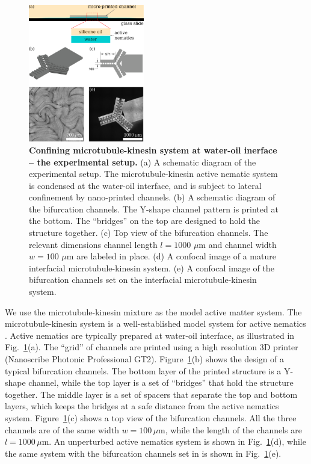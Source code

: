 \documentclass[%
10pt,
superscriptaddress,
twocolumn,
 amsmath,amssymb,
 aps,prx,
]{revtex4-2}
\begin{document}
\begin{figure}[!h]
    \includegraphics[width=0.45\textwidth]{2-bifurcation-experiment}
    \caption{
    \textbf{Confining microtubule-kinesin system at water-oil inerface -- the experimental setup.}
    (a) A schematic diagram of the experimental setup. 
    The microtubule-kinesin active nematic system is condensed at the water-oil interface, and is subject to lateral confinement by nano-printed channels. 
    (b) A schematic diagram of the bifurcation channels. 
    The Y-shape channel pattern is printed at the bottom.
    The ``bridges'' on the top are designed to hold the structure together. 
    (c) Top view of the bifurcation channels. 
    The relevant dimensions channel length $l=1000$ $\mu$m and channel width $w=100$ $\mu$m are labeled in place. 
    (d) A confocal image of a mature interfacial microtubule-kinesin system. 
    (e) A confocal image of the bifurcation channels set on the interfacial microtubule-kinesin system. 
    }
    \label{fig:bifurcation-experiment}
\end{figure}

We use the microtubule-kinesin mixture as the model active matter system. 
The microtubule-kinesin system is a well-established model system for active nematics \cite{Sanchez2012,Keber2014,Decamp2015,Hardouin2020}.
Active nematics are typically prepared at water-oil interface, as illustrated in Fig.~\ref{fig:bifurcation-experiment}(a). 
The ``grid'' of channels are printed using a high resolution 3D printer (Nanoscribe Photonic Professional GT2).
Figure~\ref{fig:bifurcation-experiment}(b) shows the design of a typical bifurcation channels.
The bottom layer of the printed structure is a Y-shape channel, while the top layer is a set of ``bridges'' that hold the structure together.
The middle layer is a set of spacers that separate the top and bottom layers, which keeps the bridges at a safe distance from the active nematics system.
Figure~\ref{fig:bifurcation-experiment}(c) shows a top view of the bifurcation channels.
All the three channels are of the same width $w=100\,\mu$m, while the length of the channels are $l=1000\,\mu$m.
An unperturbed active nematics system is shown in Fig.~\ref{fig:bifurcation-experiment}(d), while the same system with the bifurcation channels set in is shown in Fig.~\ref{fig:bifurcation-experiment}(e).
\end{document}
